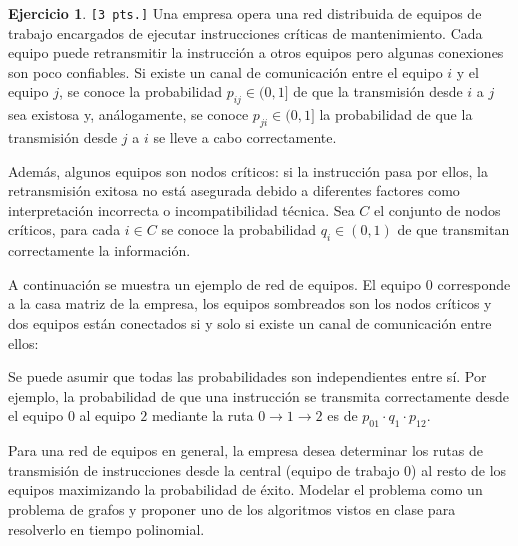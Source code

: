 \documentclass[a4paper,oneside,12pt]{amsart}
\theoremstyle{definition}
\newtheorem{quest}{Ejercicio}
\begin{document}


\begin{quest}
    \verb|[3 pts.]| Una empresa opera una red distribuida de equipos de trabajo encargados de ejecutar instrucciones
    críticas de mantenimiento. Cada equipo puede retransmitir la instrucción a otros equipos pero algunas conexiones
    son poco confiables. Si existe un canal de comunicación entre el equipo $i$ y el equipo $j$, se conoce la
    probabilidad $p_{ij}\in(0,1]$ de que la transmisión desde $i$ a $j$ sea existosa y, análogamente, se conoce
    $p_{ji}\in(0,1]$ la probabilidad de que la transmisión desde $j$ a $i$ se lleve a cabo correctamente.

    Además, algunos equipos son nodos
    críticos: si la instrucción pasa por ellos, la retransmisión exitosa no está asegurada debido a diferentes
    factores como interpretación incorrecta o incompatibilidad técnica. Sea $C$ el
    conjunto de nodos críticos, para cada $i\in C$ se conoce la probabilidad $q_i\in (0, 1)$ de que transmitan
    correctamente la información.

    A continuación se muestra un ejemplo de red de equipos. El equipo $0$ corresponde a la casa matriz de la
    empresa, los equipos sombreados son los nodos críticos y dos equipos están conectados si y solo si existe un
    canal de comunicación entre ellos:

        \begin{center}
    \end{center}

    Se puede asumir que todas las probabilidades son independientes entre sí. Por ejemplo, la probabilidad de que
    una instrucción se transmita correctamente desde el equipo $0$ al equipo $2$ mediante la ruta $0\rightarrow 1\rightarrow 2$ es de
    $p_{01}\cdot q_1 \cdot p_{12}$.

    Para una red de equipos en general, la
    empresa desea determinar los rutas de transmisión de instrucciones desde la central (equipo de trabajo $0$) al
    resto de los equipos maximizando la probabilidad de éxito. Modelar el problema como un problema
    de grafos y proponer uno de los algoritmos vistos en clase para resolverlo en tiempo polinomial.

\end{quest}


\end{document}
